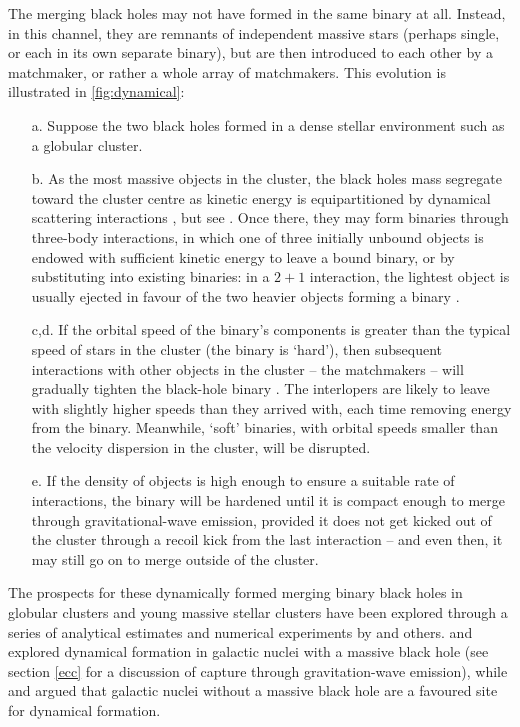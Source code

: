 \documentclass[review]{elsarticle}
\begin{document}
The merging black holes may not have formed in the same binary at all.  Instead, in this channel, they are remnants of independent massive stars (perhaps single, or each in its own separate binary), but are then introduced to each other by a matchmaker, or rather a whole array of matchmakers.   This evolution is illustrated in \autoref{fig:dynamical}: 
\begin{enumerate}
\item[a.] Suppose the two black holes formed in a dense stellar environment such as a globular cluster.  
\item[b.] As the most massive objects in the cluster, the black holes mass segregate toward the cluster centre as kinetic energy is equipartitioned by dynamical scattering interactions \citep{Spitzer:1969,BinneyTremaine}, but see \citep{Trenti:2013}.  Once there, they may form binaries through three-body interactions, in which one of three initially unbound objects is endowed with sufficient kinetic energy to leave a bound binary, or by substituting into existing binaries: in a $2+1$ interaction, the lightest object is usually ejected in favour of the two heavier objects forming a binary \citep{HillsFullerton:1980}.  
\item[c,d.] If the orbital speed of the binary's components is greater than the typical speed of stars in the cluster (the binary is `hard'), then subsequent interactions with other objects in the cluster -- the matchmakers -- will gradually tighten the black-hole binary \citep{Heggie:1975}. The interlopers are likely to leave with slightly higher speeds than they arrived with, each time removing energy from the binary.   Meanwhile, `soft' binaries, with orbital speeds smaller than the velocity dispersion in the cluster, will be disrupted. 
\item[e.] If the density of objects is high enough to ensure a suitable rate of interactions, the binary will be hardened until it is compact enough to merge through gravitational-wave emission, provided it does not get kicked out of the cluster through a recoil kick from the last interaction -- and even then, it may still go on to merge outside of the cluster.  
\end{enumerate}

The prospects for these dynamically formed merging binary black holes in globular clusters and young massive stellar clusters have been explored through a series of analytical estimates and numerical experiments by \cite{Sigurdsson:1993,Kulkarni:1993,PZwart:2000,OLeary:2006,Banerjee:2010,Downing:2011,Morscher:2015,Rodriguez:2016,Askar:2016,Park:2017,FragioneKocsis:2018,Mapelli:2020} and others.  \citet{OLeary:2008} \citep[but see][]{Tsang:2013} and \citet{AntoniniPerets:2012} explored dynamical formation in galactic nuclei with a massive black hole (see section \ref{ecc} for a discussion of capture through gravitation-wave emission), while \citet{MillerLauburg:2008} and \citet{AntoniniRasio:2016} argued that galactic nuclei without a massive black hole are a favoured site for dynamical formation.  
\end{document}
